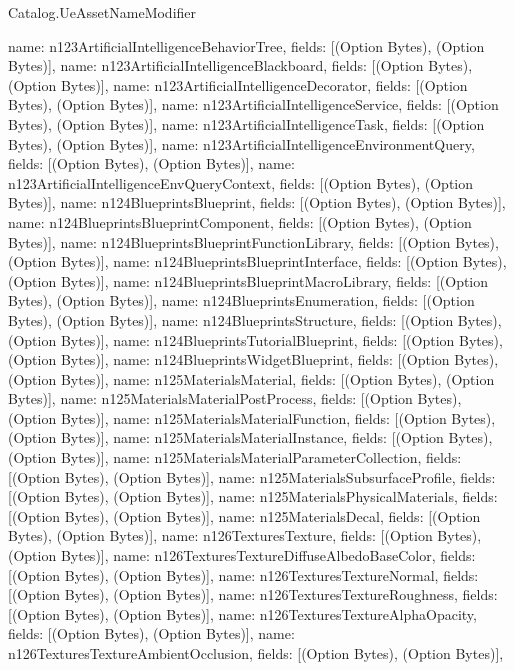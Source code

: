 \begin{lexlean}{Catalog.UeAssetNameModifier}
\begin{semanticmodule}
{    {name: n123ArtificialIntelligenceBehaviorTree, fields: [(Option Bytes), (Option Bytes)]},
    {name: n123ArtificialIntelligenceBlackboard, fields: [(Option Bytes), (Option Bytes)]},
    {name: n123ArtificialIntelligenceDecorator, fields: [(Option Bytes), (Option Bytes)]},
    {name: n123ArtificialIntelligenceService, fields: [(Option Bytes), (Option Bytes)]},
    {name: n123ArtificialIntelligenceTask, fields: [(Option Bytes), (Option Bytes)]},
    {name: n123ArtificialIntelligenceEnvironmentQuery, fields: [(Option Bytes), (Option Bytes)]},
    {name: n123ArtificialIntelligenceEnvQueryContext, fields: [(Option Bytes), (Option Bytes)]},
    {name: n124BlueprintsBlueprint, fields: [(Option Bytes), (Option Bytes)]},
    {name: n124BlueprintsBlueprintComponent, fields: [(Option Bytes), (Option Bytes)]},
    {name: n124BlueprintsBlueprintFunctionLibrary, fields: [(Option Bytes), (Option Bytes)]},
    {name: n124BlueprintsBlueprintInterface, fields: [(Option Bytes), (Option Bytes)]},
    {name: n124BlueprintsBlueprintMacroLibrary, fields: [(Option Bytes), (Option Bytes)]},
    {name: n124BlueprintsEnumeration, fields: [(Option Bytes), (Option Bytes)]},
    {name: n124BlueprintsStructure, fields: [(Option Bytes), (Option Bytes)]},
    {name: n124BlueprintsTutorialBlueprint, fields: [(Option Bytes), (Option Bytes)]},
    {name: n124BlueprintsWidgetBlueprint, fields: [(Option Bytes), (Option Bytes)]},
    {name: n125MaterialsMaterial, fields: [(Option Bytes), (Option Bytes)]},
    {name: n125MaterialsMaterialPostProcess, fields: [(Option Bytes), (Option Bytes)]},
    {name: n125MaterialsMaterialFunction, fields: [(Option Bytes), (Option Bytes)]},
    {name: n125MaterialsMaterialInstance, fields: [(Option Bytes), (Option Bytes)]},
    {name: n125MaterialsMaterialParameterCollection, fields: [(Option Bytes), (Option Bytes)]},
    {name: n125MaterialsSubsurfaceProfile, fields: [(Option Bytes), (Option Bytes)]},
    {name: n125MaterialsPhysicalMaterials, fields: [(Option Bytes), (Option Bytes)]},
    {name: n125MaterialsDecal, fields: [(Option Bytes), (Option Bytes)]},
    {name: n126TexturesTexture, fields: [(Option Bytes), (Option Bytes)]},
    {name: n126TexturesTextureDiffuseAlbedoBaseColor, fields: [(Option Bytes), (Option Bytes)]},
    {name: n126TexturesTextureNormal, fields: [(Option Bytes), (Option Bytes)]},
    {name: n126TexturesTextureRoughness, fields: [(Option Bytes), (Option Bytes)]},
    {name: n126TexturesTextureAlphaOpacity, fields: [(Option Bytes), (Option Bytes)]},
    {name: n126TexturesTextureAmbientOcclusion, fields: [(Option Bytes), (Option Bytes)]},
}
\end{semanticmodule}
\end{lexlean}
